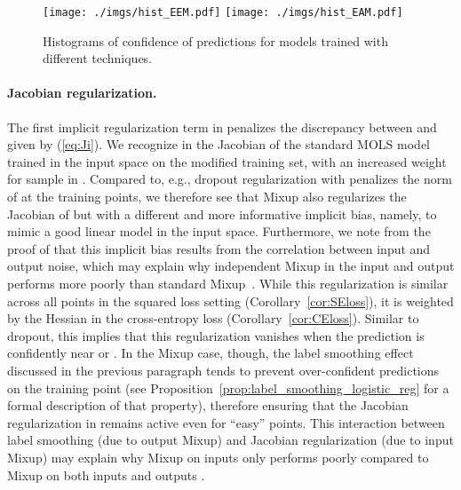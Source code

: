 \documentclass[twoside,11pt]{article}
\begin{document}
\begin{figure*}[ht]
\centering
    \texttt{[image: ./imgs/hist\_EEM.pdf]}
    \texttt{[image: ./imgs/hist\_EAM.pdf]}
    \caption{
        \small{Histograms of confidence of predictions for models trained with different techniques.}
        }\label{fig:confidence-lenet}
\end{figure*}



\paragraph{Jacobian regularization.} The first implicit regularization term  in  penalizes the discrepancy between  and  given by (\ref{eq:Ji}). We recognize in  the Jacobian of the standard MOLS model trained in the input space on the modified training set, with an increased weight for sample  in 
. Compared to, e.g., dropout regularization with penalizes the norm of  at the training points, we therefore see that Mixup also regularizes the Jacobian of  but with a different and more informative implicit bias, namely, to mimic a good linear model in the input space. Furthermore, we note from the proof of  that this implicit bias results from the correlation between input and output noise, which may explain why independent Mixup in the input and output performs more poorly than standard Mixup~\citep{Zhang2018mixup}. While this regularization is similar across all points in the squared loss setting (Corollary~\ref{cor:SEloss}), it is weighted by the Hessian  in the cross-entropy loss (Corollary~\ref{cor:CEloss}). Similar to dropout, this implies that this regularization vanishes when the prediction  is confidently near  or . In the Mixup case, though, the label smoothing effect discussed in the previous paragraph tends to prevent over-confident predictions on the training point (see Proposition~\ref{prop:label_smoothing_logistic_reg} for a formal description of that property), therefore ensuring that the Jacobian regularization in  remains active even for ``easy'' points. This interaction between label smoothing (due to output Mixup) and Jacobian regularization (due to input Mixup) may explain why Mixup on inputs only performs poorly compared to Mixup on both inputs and outputs \citep{thulasidasan2019mixup}.
\end{document}
